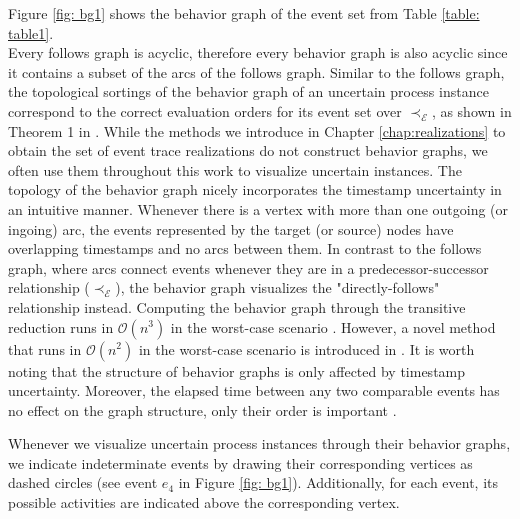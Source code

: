 Figure \ref{fig: bg1} shows the behavior graph of the event set from Table \ref{table: table1}.\\
Every follows graph is acyclic, therefore every behavior graph is also acyclic since it contains a subset of the arcs of the follows graph.
Similar to the follows graph, the topological sortings of the behavior graph of an uncertain process instance correspond to the correct evaluation orders for its event set over $\prec_{\mathcal{E}}$, as shown in Theorem 1 in \cite{conformance}.
While the methods we introduce in Chapter \ref{chap:realizations} to obtain the set of event trace realizations do not construct behavior graphs, we often use them throughout this work to visualize uncertain instances.
The topology of the behavior graph nicely incorporates the timestamp uncertainty in an intuitive manner.
Whenever there is a vertex with more than one outgoing (or ingoing) arc, the events represented by the target (or source) nodes have overlapping timestamps and no arcs between them.
In contrast to the follows graph, where arcs connect events whenever they are in a predecessor-successor relationship ($\prec_{\mathcal{E}}$), the behavior graph visualizes the "directly-follows" relationship instead.
Computing the behavior graph through the transitive reduction runs in $\mathcal{O}(n^3)$ in the worst-case scenario \cite{transitive}.
However, a novel method that runs in $\mathcal{O}(n^2)$ in the worst-case scenario is introduced in \cite{efficient}.
It is worth noting that the structure of behavior graphs is only affected by timestamp uncertainty.
Moreover, the elapsed time between any two comparable events has no effect on the graph structure, only their order is important \cite{space}.

Whenever we visualize uncertain process instances through their behavior graphs, we indicate indeterminate events by drawing their corresponding vertices as dashed circles (see event $e_4$ in Figure \ref{fig: bg1}).
Additionally, for each event, its possible activities are indicated above the corresponding vertex.


